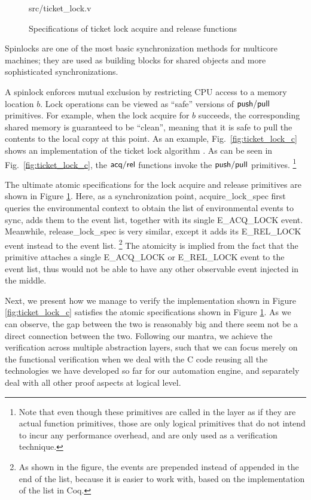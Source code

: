 \begin{figure}
	 {src/ticket_lock.v}
	\caption{Specifications of ticket lock acquire and release functions}
	\label{fig:ticket_lock_v}
\end{figure}

Spinlocks are one of the most basic synchronization
methods for multicore machines; they are used as building
blocks for shared objects and more sophisticated synchronizations.


A spinlock enforces mutual exclusion by restricting CPU access to
a memory location $b$. Lock operations can be viewed
as ``safe'' versions of $\mathsf{push}/\mathsf{pull}$ primitives.
For example, when the lock acquire  for $b$ succeeds,
the corresponding shared memory is guaranteed
to be ``clean'', meaning that it is safe to 
pull the contents to the local copy at this point.
As an example, Fig.~\ref{fig:ticket_lock_c} shows
an implementation of the ticket lock algorithm \cite{mcs91}.
As can be seen in Fig.~\ref{fig:ticket_lock_c},
the $\mathsf{acq}/\mathsf{rel}$ functions invoke the $\mathsf{push}/\mathsf{pull}$ primitives.
\footnote{Note that even though these primitives are
called in the layer as if they are actual function primitives,
those are only logical primitives that do not intend to incur
any performance overhead, and are only used as a verification
technique.}

The ultimate atomic specifications for the lock acquire and release primitives
are shown in Figure \ref{fig:ticket_lock_v}. 
Here, as a synchronization point, \textsf{acquire\_lock\_spec} first queries the
environmental context to obtain the list of environmental events to sync, adds
them to the event list, together with its single \textsf{E\_ACQ\_LOCK} event.
Meanwhile, \textsf{release\_lock\_spec} is very similar, except it adds its
 \textsf{E\_REL\_LOCK} event instead to the event list. \footnote{As shown in the figure,
 the events are prepended instead of appended in the end of the list, because it is easier
 to work with, based on the implementation of the list in Coq.}
The atomicity is implied from the fact
that the primitive attaches a single \textsf{E\_ACQ\_LOCK} or \textsf{E\_REL\_LOCK}
event to the event list, thus would not be able to have any other observable event
injected in the middle. 

Next, we present how we manage to verify the implementation shown in Figure
\ref{fig:ticket_lock_c} satisfies the atomic specifications shown in Figure
\ref{fig:ticket_lock_v}. As we can observe, the gap between the two is reasonably
big and there seem not be a direct connection between the two.
Following our mantra, we achieve the verification across multiple abstraction layers,
such that we can focus merely on the functional verification when we deal with the
C code reusing all the technologies we have developed so far for our automation engine,
and separately deal with all other proof aspects at logical level.


